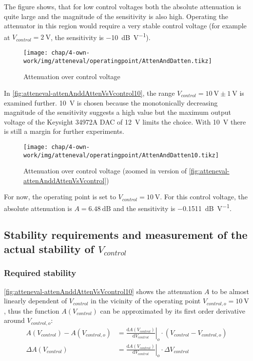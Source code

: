 The figure shows, that for low control voltages both the absolute attenuation is quite large and the magnitude of the sensitivity is also high. Operating the attenuator in this region would require a very stable control voltage (for example at $V_{control}=\SI{2}{\volt}$, the sensitivity is \SI{-10}{\dB\per\volt}).

\begin{figure}[tb]
	\centering
	\texttt{[image: chap/4-own-work/img/atteneval/operatingpoint/AttenAndDatten.tikz]}
	\caption{Attenuation over control voltage}
	\label{fig:atteneval-attenAnddAttenVsVcontrol}
\end{figure}

In \autoref{fig:atteneval-attenAnddAttenVsVcontrol10}, the range $V_{control}=\SI{10}{\volt}\pm\SI{1}{\volt}$ is examined further. \SI{10}{\volt} is chosen because the monotonically decreasing magnitude of the sensitivity suggests a high value but the maximum output voltage of the Keysight 34972A DAC of \SI{12}{\volt} limits the choice. With \SI{10}{\volt} there is still a margin for further experiments.

\begin{figure}[tb]
	\centering
	\texttt{[image: chap/4-own-work/img/atteneval/operatingpoint/AttenAndDatten10.tikz]}
	\caption{Attenuation over control voltage (zoomed in version of \autoref{fig:atteneval-attenAnddAttenVsVcontrol})}
	\label{fig:atteneval-attenAnddAttenVsVcontrol10}
\end{figure}

For now, the operating point is set to $V_{control}=\SI{10}{\volt}$. For this control voltage, the absolute attenuation is $A=\SI{6.48}{\dB}$ and the sensitivity is \SI{-0.1511}{\dB\per\volt}.

\FloatBarrier
\subsection{Stability requirements and measurement of the actual stability of $V_{control}$}
\subsubsection{Required stability}
\autoref{fig:atteneval-attenAnddAttenVsVcontrol10} shows the attenuation $A$ to be almost linearly dependent of $V_{control}$ in the vicinity of the operating point $V_{control,o}=\SI{10}{\volt}$, thus the function $A(V_{control})$ can be approximated by its first order derivative around $V_{control,o}$:
\begin{align}
A(V_{control}) - A(V_{control,o}) &= \left.\frac{\text{d}A(V_{control})}{\text{d}V_{control}}\right|_{o} \cdot 
\left( V_{control} - V_{control,o}\right)\\
\Delta A(V_{control}) &= \left.\frac{\text{d}A(V_{control})}{\text{d}V_{control}}\right|_{o} \cdot \Delta V_{control}
\end{align}

